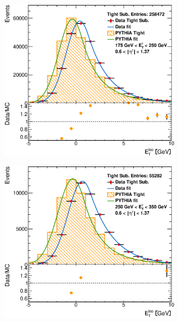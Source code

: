 \documentclass[12pt, twoside]{article}
\numberwithin{equation}{section}
\numberwithin{figure}{section}
\newenvironment{changemargin}[2]{%
\begin{list}{}{%
\setlength{\topsep}{0pt}%
\setlength{\leftmargin}{#1}%
\setlength{\rightmargin}{#2}%
\setlength{\listparindent}{\parindent}%
\setlength{\itemindent}{\parindent}%
\setlength{\parsep}{\parskip}%
}%
\item[]}{\end{list}}
\begin{document}
\begin{figure}[H]
\begin{changemargin}{-1.0cm}{-0.75cm}
\begin{changemargin}{-0.75cm}{-1.0cm}
\begin{subfigure}[b]{0.27\textwidth}
        \end{subfigure}
        \begin{subfigure}[b]{0.27\textwidth}
            \includegraphics[width=\textwidth]{./images/EtISOCorrection/T_MC_FITS-22(10GeV)(Before).eps}
        \end{subfigure}
        \begin{subfigure}[b]{0.27\textwidth}
            \includegraphics[width=\textwidth]{./images/EtISOCorrection/T_MC_FITS-23(10GeV)(Before).eps}
        \end{subfigure}


\end{changemargin}
\end{changemargin}
\end{figure}
\end{document}

